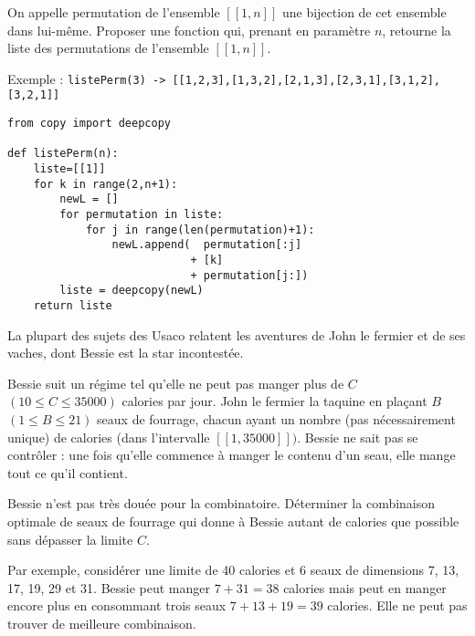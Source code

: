 \begin{Exercise}
On appelle permutation de l'ensemble $[\![1, n]\!]$ une bijection de cet ensemble dans lui-même. Proposer une fonction qui, prenant en paramètre $n$, retourne la liste des
permutations de l'ensemble $[\![1, n]\!]$.

Exemple : {\tt listePerm(3) -> [[1,2,3],[1,3,2],[2,1,3],[2,3,1],[3,1,2],[3,2,1]]}
\end{Exercise}
\begin{Answer}
\begin{lstlisting}
from copy import deepcopy

def listePerm(n):
    liste=[[1]]
    for k in range(2,n+1):
        newL = []
        for permutation in liste:
            for j in range(len(permutation)+1):
                newL.append(  permutation[:j]
                            + [k]
                            + permutation[j:])
        liste = deepcopy(newL)
    return liste
\end{lstlisting}
\end{Answer}
\begin{Exercise}[title = {Exercice des olympiade US, USACO}]
La plupart des sujets des Usaco relatent les aventures de John le fermier et de ses vaches, dont Bessie est la star incontestée.

Bessie suit un régime tel qu'elle ne peut pas manger plus de $C$ $(10\le C\le 35000)$ calories par jour. John le fermier la taquine en plaçant $B$ $(1\le  B\le 21)$ seaux de fourrage, chacun ayant un nombre (pas nécessairement unique) de calories (dans l'intervalle $[\![1,35000]\!])$. Bessie ne sait pas se contr\^oler : une fois qu'elle commence à manger le contenu d'un seau, elle mange tout ce qu'il contient.

Bessie n'est pas très douée pour la combinatoire. Déterminer la combinaison optimale de seaux de fourrage qui donne à Bessie autant de calories que possible sans dépasser la limite $C$.

Par exemple, considérer une limite de 40 calories et 6 seaux de dimensions 7, 13, 17, 19, 29 et 31. Bessie peut manger $7+31=38$ calories mais peut en manger encore plus en consommant trois seaux $7+13+19=39$ calories. Elle ne peut pas trouver de meilleure combinaison.
\end{Exercise}
